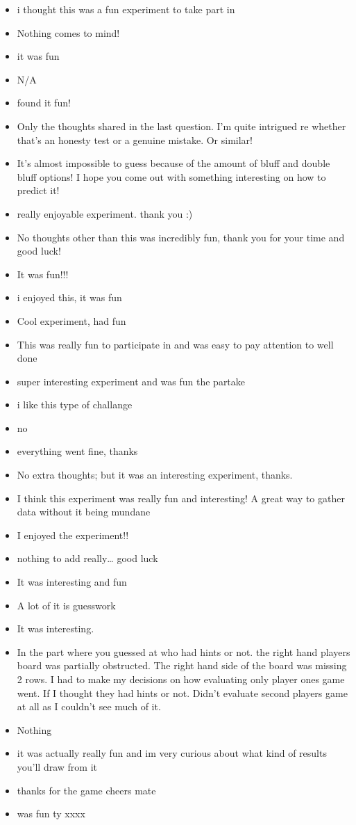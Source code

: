 \documentclass[
  english,
  man]{apa6}
\begin{document}
\begin{itemize}
\item
  i thought this was a fun experiment to take part in
\item
  Nothing comes to mind!
\item
  it was fun
\item
  N/A
\item
  found it fun!
\item
  Only the thoughts shared in the last question. I'm quite intrigued re whether that's an honesty test or a genuine mistake. Or similar!
\item
  It's almost impossible to guess because of the amount of bluff and double bluff options! I hope you come out with something interesting on how to predict it!
\item
  really enjoyable experiment. thank you :)
\item
  No thoughts other than this was incredibly fun, thank you for your time and good luck!
\item
  It was fun!!!
\item
  i enjoyed this, it was fun
\item
  Cool experiment, had fun
\item
  This was really fun to participate in and was easy to pay attention to well done
\item
  super interesting experiment and was fun the partake
\item
  i like this type of challange
\item
  no
\item
  everything went fine, thanks
\item
  No extra thoughts; but it was an interesting experiment, thanks.
\item
  I think this experiment was really fun and interesting! A great way to gather data without it being mundane
\item
  I enjoyed the experiment!!
\item
  nothing to add really\ldots{} good luck
\item
  It was interesting and fun
\item
  A lot of it is guesswork
\item
  It was interesting.
\item
  In the part where you guessed at who had hints or not. the right hand players board was partially obstructed. The right hand side of the board was missing 2 rows. I had to make my decisions on how evaluating only player ones game went. If I thought they had hints or not. Didn't evaluate second players game at all as I couldn't see much of it.
\item
  Nothing
\item
  it was actually really fun and im very curious about what kind of results you'll draw from it
\item
  thanks for the game cheers mate
\item
  was fun ty xxxx
\end{itemize}
\end{document}
